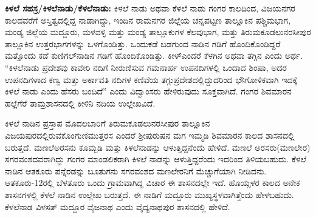 \textbf{ಕಿಳಲೆ ಸಹಸ್ರ/ಕಿಳಲೆನಾಡು/ಕೆಳಲೆನಾಡು: } ಕಿಳಲೆ ನಾಡು ಅಥವಾ ಕೆಳಲೆ ನಾಡು ಗಂಗರ ಕಾಲದಿಂದ, ವಿಜಯನಗರ ಕಾಲದವರೆಗೆ ಅಸ್ತಿತ್ವದಲ್ಲಿದ್ದ ನಾಡಾಗಿದ್ದು, ಇಂದಿನ ರಾಮನಗರ ಜಿಲ್ಲೆಯ ಚನ್ನಪಟ್ಟಣ ತಾಲ್ಲೂಕಿನ ಪಶ್ಚಿಮಭಾಗ, ಮಂಡ್ಯ ಜಿಲ್ಲೆಯ ಮದ್ದೂರು, ಮಳವಳ್ಳಿ ಮತ್ತು ಮಂಡ್ಯ ತಾಲ್ಲೂಕುಗಳ ಕೆಲವುಭಾಗ, ಮತ್ತು ತಿರುಮಕೂಡಲುನರಸೀಪುರ ತಾಲ್ಲೂಕಿನ ಉತ್ತರಭಾಗಗಳನ್ನು ಒಳಗೊಂಡಿತ್ತು. ಒಂದುಕಡೆ ಬಡಗುಂದ ನಾಡಿನ ಗಡಿಗೆ ಹೊಂದಿಕೊಂಡಿದ್ದರೆ ಮತ್ತೊಂದು ಕಡೆ ಕುಣಿಗಲ್​ನಾಡಿನ ಗಡಿಗೆ ಹೊಂದಿಕೊಂಡಿತ್ತು. ಕೀಳ್​ ಎಂದರೆ ಕೆಳಗಿನ ಅಥವಾ ತಗ್ಗಿನ ಎಂದು ಅರ್ಥ. “ಕಿಳಲೆನಾಡು ಪ್ರದೇಶವು ಕಾವೇರಿ ನದಿಗೆ ನೀರುಣಿಸುವ ಗಮನಾರ್ಹ ಉಪನದಿಗಳಲ್ಲಿ ಒಂದಾದ ಶಿಂಷಾ, ಅದರ ಉಪನದಿಗಳಾದ ಕಣ್ವ ಮತ್ತು ಅರ್ಕಾವತಿ ನದಿಗಳ ಕಣಿವೆಯ ತಗ್ಗುಪ್ರದೇಶದಲ್ಲಿದ್ದುದರಿಂದ ಭೌಗೋಳಿಕವಾಗಿ ಇದಕ್ಕೆ ಕಿಳಲೆ ನಾಡು ಎಂದು ಹೆಸರು ಬಂದಿದೆ” ಎಂದು ವಿದ್ವಾಂಸರು ಹೇಳಿರುವುದು ಸೂಕ್ತವಾಗಿದೆ. ಗಂಗರ ಶಿವಮಾರನ ಹಲ್ಲೆಗೆರೆ ತಾಮ್ರಶಾಸನದಲ್ಲಿ ಕೀಳಿನಿ ನದಿಯ ಉಲ್ಲೇಖವಿದೆ.

ಕಿಳಲೆ ನಾಡಿನ ಪ್ರಸ್ತಾಪ ಮೊದಲಬಾರಿಗೆ ತಿರುಮಕೂಡಲುನರಸೀಪುರ ತಾಲ್ಲೂಕಿನ ವಿಜಯಪುರದಲ್ಲಿರುವ\break ಕೊಂಗುಣಿಮುತ್ತರಸ ಎಂದರೆ ಶ‍್ರೀಪುರುಷನ ಮಗ ಇಮ್ಮಡಿ ಶಿವಮಾರನ ಕಾಲದ ಶಾಸನದಲ್ಲಿ ಬರುತ್ತದೆ. ಮಣಲೆಅರಸನು ಕೂಮ್ಬಡಿ ಮತ್ತು ಕಿಳಲೆನಾಡನ್ನು ಆಳುತ್ತಿದ್ದನೆಂದು ಹೇಳಿದೆ. ಮಣಲೆ ಅರಸರು(ಮಣಲೇರ) ಸಗರವಂಶದವರಾಗಿದ್ದು ಗಂಗರ ಮಾಂಡಲಿಕರಾಗಿ ಕಿಳಲೆ ನಾಡನ್ನು ಆಳುತ್ತಿದ್ದರೆಂದು ಇದರಿಂದ ತಿಳಿಯಬಹುದು. ಕೆಳಲೆ ನಾಡಿನ ಆತಕೂರು ಪನ್ನೆರಡನ್ನು ಬೂತುಗನು ಸಗರವಂಶದ ಮಣಲೇರನಿಗೆ ಮೆಚ್ಚುಗೆಯಾಗಿ ನೀಡಿದನು. ಆತಕೂರು-12ರಲ್ಲಿ ಬೆಳತೂರು ಒಂದು ಗ್ರಾಮವಾಗಿದ್ದ ವಿಚಾರ ಈ ಶಾಸನದಲ್ಲೇ ಇದೆ. ಹೊಯ್ಸಳರ ಕಾಲದ ಅನೇಕ ಶಾಸನಗಳಲ್ಲಿ ಕೆಳಲೆ ನಾಡಿನ ಉಲ್ಲೇಖ ಬರುತ್ತದೆ. ಈ ನಾಡಿಗೆ ಮದ್ದೂರು ಮುಖ್ಯಸ್ಥಳವಾಗಿತ್ತೆಂದು ಹೇಳಬಹುದು. ಕೆಳಲೆನಾಡ ವಿಳಸತ್​ ಮದ್ದೂರ ವೈಜನಾಥ ಎಂದು ವೈದ್ಯನಾಥಪುರ ಶಾಸನದಲ್ಲಿ ಹೇಳಿದೆ.

